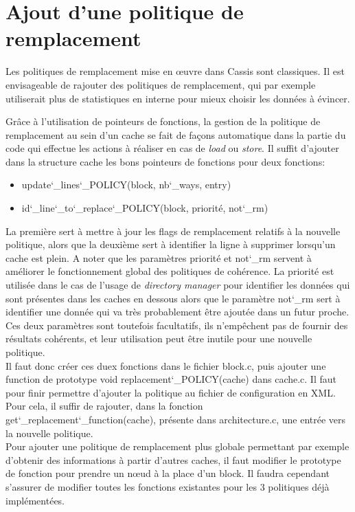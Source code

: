 \section{Ajout d'une politique de remplacement}
Les politiques de remplacement mise en {\oe}uvre dans \textsf{Cassis} sont classiques. Il est envisageable de rajouter des politiques de remplacement, qui par exemple utiliserait plus de statistiques en interne pour mieux choisir les données à évincer.

Grâce à l'utilisation de pointeurs de fonctions, la gestion de la politique de remplacement au sein d'un cache se fait de façons automatique dans la partie du code qui effectue les actions à réaliser en cas de \emph{load} ou \emph{store}. Il suffit d'ajouter dans la structure cache les bons pointeurs de fonctions pour deux fonctions: \\
\begin{itemize}
\item update\char`_lines\char`_POLICY(block, nb\char`_ways, entry)
\item id\char`_line\char`_to\char`_replace\char`_POLICY(block, priorité, not\char`_rm) \\
\end{itemize}
La première sert à mettre à jour les flags de remplacement relatifs à la nouvelle politique, alors que la deuxième sert à identifier la ligne à supprimer lorsqu'un cache est plein. A noter que les paramètres priorité et not\char`_rm servent à améliorer le fonctionnement global des politiques de cohérence. La priorité est utilisée dans le cas de l'usage de \emph{directory manager} pour identifier les données qui sont présentes dans les caches en dessous alors que le paramètre not\char`_rm sert à identifier une donnée qui va très probablement être ajoutée dans un futur proche. Ces deux paramètres sont toutefois facultatifs, ils n'empêchent pas de fournir des résultats cohérents, et leur utilisation peut être inutile pour une nouvelle politique. \\

Il faut donc créer ces duex fonctions dans le fichier block.c, puis ajouter une function de prototype void replacement\char`_POLICY(cache) dans cache.c. Il faut pour finir permettre d'ajouter la politique au fichier de configuration en XML. Pour cela, il suffir de rajouter, dans la fonction get\char`_replacement\char`_function(cache), présente dans architecture.c, une entrée vers la nouvelle politique. \\

Pour ajouter une politique de remplacement plus globale permettant par exemple d'obtenir des informations à partir d'autres caches, il faut modifier le prototype de fonction pour prendre un n{\oe}ud à la place d'un block. Il faudra cependant s'assurer de modifier toutes les fonctions existantes pour les $3$ politiques déjà implémentées.

